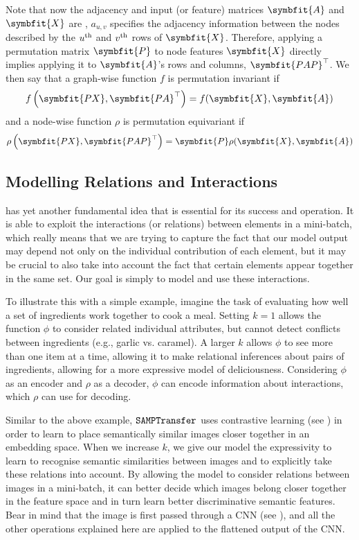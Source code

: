 Note that now the adjacency and input (or feature) matrices $\symbfit{A}$ and $\symbfit{X}$ are , $a_{u, v}$
specifies the adjacency information between the nodes described by the $u\textsuperscript{th}$ and $v\textsuperscript{th}$
rows of $\symbfit{X}$. Therefore, applying a permutation matrix $\symbfit{P}$ to node features $\symbfit{X}$ directly implies applying it to $\symbfit{A}$'s rows and columns, $\symbfit{PAP}^\top$. We then say that a graph-wise function $f$ is permutation invariant if 
\begin{equation}
    f\left(\symbfit{P X}, \symbfit{P A}^{\top}\right)=f(\symbfit{X}, \symbfit{A})
\end{equation}
and a node-wise function $\rho$ is permutation equivariant if
\begin{equation}
    \rho\left(\symbfit{P X}, \symbfit{P A P}^{\top}\right)=\symbfit{P}\rho(\symbfit{X}, \symbfit{A})
\end{equation}

\subsection{Modelling Relations and Interactions}\label{ssec:relation-and-interactions}

\samptr{} has yet another fundamental idea that is essential for its success and operation. 
It is able to exploit the interactions (or relations) between elements in a mini-batch, which really means that we are trying to capture the fact that our model output may depend not only on the individual contribution of each element, but it may be crucial to also take into account the fact that certain elements appear together in the same set. Our goal is simply to model and use these interactions.

To illustrate this with a simple example, imagine the task of evaluating how well a set of ingredients work together to cook a meal. Setting $k=1$ allows the function $\phi$ to consider related individual attributes, but cannot detect conflicts between ingredients (e.g., garlic vs. caramel). A larger $k$ allows $\phi$ to see more than one item at a time, allowing it to make relational inferences about pairs of ingredients, allowing for a more expressive model of deliciousness. Considering $\phi$ as an encoder and $\rho$ as a decoder, $\phi$ can encode information about interactions, which $\rho$ can use for decoding.

Similar to the above example, $\texttt{SAMPTransfer}$ uses contrastive learning (see ) in order to learn to place semantically similar images closer together in an embedding space. When we increase $k$, we give our model the expressivity to learn to recognise semantic similarities between images and to explicitly take these relations into account. By allowing the model to consider relations between images in a mini-batch, it can better decide which images belong closer together in the feature space and in turn learn better discriminative semantic features. Bear in mind that the image is first passed through a CNN (see ), and all the other operations explained here are applied to the flattened output of the CNN.


